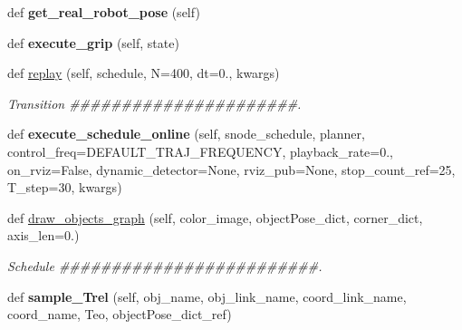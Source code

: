 \begin{DoxyCompactItemize}
\mbox{\label{classrnb-planning_1_1src_1_1pkg_1_1tmp__framework_1_1_t_m_p_framework_a912540d18e5d26987b9164c7c1632e2e}} 
def {\bfseries get\+\_\+real\+\_\+robot\+\_\+pose} (self)
\item 
\mbox{\label{classrnb-planning_1_1src_1_1pkg_1_1tmp__framework_1_1_t_m_p_framework_aa841753bcab475d68b32b39447300b50}} 
def {\bfseries execute\+\_\+grip} (self, state)
\item 
def \hyperlink{classrnb-planning_1_1src_1_1pkg_1_1tmp__framework_1_1_t_m_p_framework_afa1974ab961085334284e468ad2efe33}{replay} (self, schedule, N=400, dt=0., kwargs)
\begin{DoxyCompactList}\small\item\em Transition \#\#\#\#\#\#\#\#\#\#\#\#\#\#\#\#\#\#\#\#\#\#. \end{DoxyCompactList}\item 
\mbox{\label{classrnb-planning_1_1src_1_1pkg_1_1tmp__framework_1_1_t_m_p_framework_adb3709d150c2629d9a23ffe582955e43}} 
def {\bfseries execute\+\_\+schedule\+\_\+online} (self, snode\+\_\+schedule, planner, control\+\_\+freq=D\+E\+F\+A\+U\+L\+T\+\_\+\+T\+R\+A\+J\+\_\+\+F\+R\+E\+Q\+U\+E\+N\+CY, playback\+\_\+rate=0., on\+\_\+rviz=False, dynamic\+\_\+detector=None, rviz\+\_\+pub=None, stop\+\_\+count\+\_\+ref=25, T\+\_\+step=30, kwargs)
\item 
def \hyperlink{classrnb-planning_1_1src_1_1pkg_1_1tmp__framework_1_1_t_m_p_framework_a9bec34f98a11225a406abf17c0869afe}{draw\+\_\+objects\+\_\+graph} (self, color\+\_\+image, object\+Pose\+\_\+dict, corner\+\_\+dict, axis\+\_\+len=0.)
\begin{DoxyCompactList}\small\item\em Schedule \#\#\#\#\#\#\#\#\#\#\#\#\#\#\#\#\#\#\#\#\#\#\#\#\#. \end{DoxyCompactList}\item 
\mbox{\label{classrnb-planning_1_1src_1_1pkg_1_1tmp__framework_1_1_t_m_p_framework_ae2e3f5a4c514e9eddfb77f721584ba84}} 
def {\bfseries sample\+\_\+\+Trel} (self, obj\+\_\+name, obj\+\_\+link\+\_\+name, coord\+\_\+link\+\_\+name, coord\+\_\+name, Teo, object\+Pose\+\_\+dict\+\_\+ref)

\end{DoxyCompactItemize}
